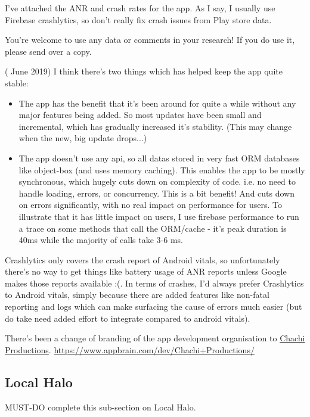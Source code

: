 I've attached the ANR and crash rates for the app. As I say, I usually use Firebase crashlytics, so don't really fix crash issues from Play store data.

You're welcome to use any data or comments in your research! If you do use it, please send over a copy.

( June 2019)
I think there's two things which has helped keep the app quite stable:
\begin{itemize}
    \item The app has the benefit that it's been around for quite a while without any major features being added. So most updates have been small and incremental, which has gradually increased it's stability. (This may change when the new, big update drops...)
    \item The app doesn't use any api, so all datas stored in very fast ORM databases like object-box (and uses memory caching). This enables the app to be mostly synchronous, which hugely cuts down on complexity of code. i.e. no need to handle loading, errors, or concurrency. This is a bit benefit! And cuts down on errors significantly, with no real impact on performance for users. To illustrate that it has little impact on users, I use firebase performance to run a trace on some methods that call the ORM/cache - it's peak duration is 40ms while the majority of calls take 3-6 ms.
\end{itemize} 

Crashlytics only covers the crash report of Android vitals, so unfortunately there's no way to get things like battery usage of ANR reports unless Google makes those reports available :(. In terms of crashes, I'd always prefer Crashlytics to Android vitals, simply because there are added features like non-fatal reporting and logs which can make surfacing the cause of errors much easier (but do take need added effort to integrate compared to android vitals).

There's been a change of branding of the app development organisation to \href{https://play.google.com/store/apps/developer?id=Chachi+Productions&hl=en_GB&gl=US}{Chachi Productions}. \url{https://www.appbrain.com/dev/Chachi+Productions/}

\subsection{Local Halo}
MUST-DO complete this sub-section on Local Halo.

